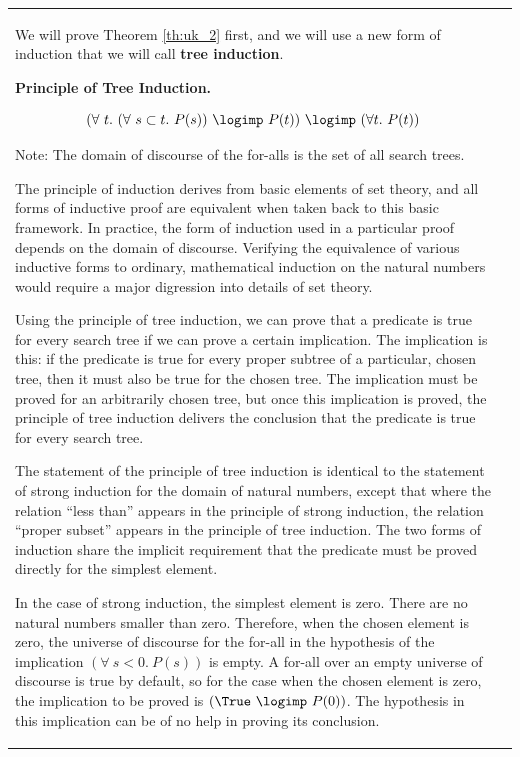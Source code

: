 \begin{tabular}{ll}
\begin{theorem}
\end{theorem}

We will prove\index{$\mathtt{dataElems}$} Theorem \ref{th:uk_2}
first, and we will use a new form of induction that we will call
{\bf tree induction}\index{tree induction}.


\medskip
\noindent\textbf{Principle of Tree Induction.}

$$
  (\forall\  t.\ (\forall\  s\subset t.\  P(s))\
\logimp\  P(t))\ \logimp\  (\forall t.\  P(t))$$

Note: The domain of discourse of the for-alls is the set of all
search trees.

The principle of induction derives from basic elements of set
theory, and all forms of inductive proof are equivalent when taken
back to this basic framework. In practice, the form of induction
used in a particular proof depends on the domain of discourse.
Verifying the equivalence of various inductive forms to ordinary,
mathematical induction on the natural numbers would require a major
digression into details of set theory.



Using the principle of tree induction, we can prove that a predicate
is true for every search tree if we can prove a certain implication.
The implication is this: if the predicate is true for every proper
subtree of a particular, chosen tree, then it must also be true for
the chosen tree. The implication must be proved for an arbitrarily
chosen tree, but once this implication is proved, the principle of
tree induction delivers the conclusion that the predicate is true
for every search tree.

The statement of the principle of tree induction is identical to the
statement of strong induction for the domain of natural numbers,
except that where the relation ``less than'' appears in the
principle of strong induction, the relation ``proper subset''
appears in the principle of tree induction. The two forms of
induction share the implicit requirement that the predicate must be
proved directly for the simplest element.

In the case of strong induction, the simplest element is zero. There
are no natural numbers smaller than zero. Therefore, when the chosen
element is zero, the universe of discourse for the for-all in the
hypothesis of the implication $(\forall\ s < 0.\  P(s))$ is empty. A
for-all over an empty universe of discourse is true by default, so
for the case when the chosen element is zero, the implication to be
proved is $(\True\ \logimp\  P(0))$. The hypothesis in this
implication can be of no help in proving its conclusion.



\end{tabular}
